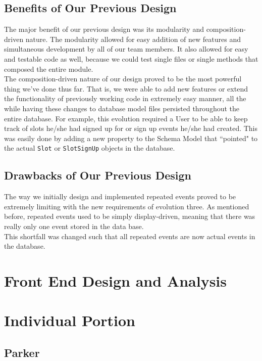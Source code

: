 \documentclass[11pt]{article}   %
\begin{document}
\subsection{Benefits of Our Previous Design}
The major benefit of our previous design was its modularity and composition-driven nature. The modularity allowed for easy addition of new features and simultaneous development by all of our team members. It also allowed for easy and testable code as well, because we could test single files or single methods that composed the entire module.\\

\noindent The composition-driven nature of our design proved to be the most powerful thing we've done thus far. That is, we were able to add new features or extend the functionality of previously working code in extremely easy manner, all the while having these changes to database model files persisted throughout the entire database. For example, this evolution required a User to be able to keep track of slots he/she had signed up for or sign up events he/she had created. This was easily done by adding a new property to the Schema Model that ``pointed" to the actual \texttt{Slot} or \texttt{SlotSignUp} objects in the database.

\subsection{Drawbacks of Our Previous Design}
The way we initially design and implemented repeated events proved to be extremely limiting with the new requirements of evolution three. As mentioned before, repeated events used to be simply display-driven, meaning that there was really only one event stored in the data base.\\

\noindent This shortfall was changed such that all repeated events are now actual events in the database.


\section{Front End Design and Analysis}



\section{Individual Portion}
\subsection*{Parker}
\end{document}
